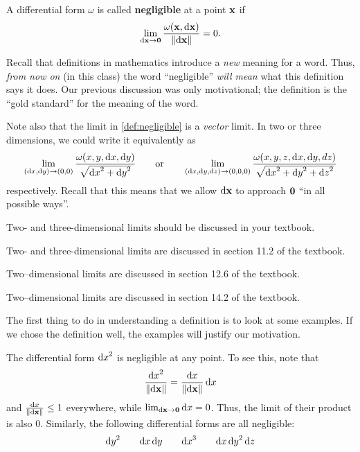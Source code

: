 \documentclass[12pt]{amsart}
\begin{document}
\begin{defn}\label{def:negligible}
  A differential form $\omega$ is called \textbf{negligible} at a point $\mathbf{x}$ if
  \[ \lim_{{\mathrm{d} \mathbf{x}}\to\mathbf{0}} \frac{\omega(\mathbf{x},{\mathrm{d} \mathbf{x}})}{\Vert {\ensuremath{\mathrm{d} \mathbf{x}}} \Vert} = 0. \]
\end{defn}

Recall that definitions in mathematics introduce a \emph{new} meaning for a word.
Thus, \emph{from now on} (in this class) the word ``negligible'' \emph{will mean} what this definition says it does.
Our previous discussion was only motivational; the definition is the ``gold standard'' for the meaning of the word.

Note also that the limit in \cref{def:negligible} is a \emph{vector} limit.
In two or three dimensions, we could write it equivalently as
\[ \lim_{({\mathrm{d} x},{\mathrm{d} y})\to(0,0)} \frac{\omega(x,y,{\mathrm{d} x},{\mathrm{d} y})}{\sqrt{{\mathrm{d} x}^2+{\mathrm{d} y}^2}} \qquad\text{or}\qquad
\lim_{({\mathrm{d} x},{\mathrm{d} y},{\mathrm{d} z})\to(0,0,0)} \frac{\omega(x,y,z,{\mathrm{d} x},{\mathrm{d} y},dz)}{\sqrt{{\mathrm{d} x}^2+{\mathrm{d} y}^2+{\mathrm{d} z}^2}}
\]
respectively.
Recall that this means that we allow ${\mathrm{d} \mathbf{x}}$ to approach $\mathbf{0}$ ``in all possible ways''.
\begin{notextbook}Two- and three-dimensional limits should be discussed in your textbook.\end{notextbook}%
\begin{stewart}Two- and three-dimensional limits are discussed in section 11.2 of the textbook.\end{stewart}
\begin{hugheshallett}Two--dimensional limits are discussed in section 12.6 of the textbook.\end{hugheshallett}
\begin{rogawski}Two--dimensional limits are discussed in section 14.2 of the textbook.\end{rogawski}
The first thing to do in understanding a definition is to look at some examples.
If we chose the definition well, the examples will justify our motivation.

\begin{eg}
  The differential form ${\mathrm{d} x}^2$ is negligible at any point.
  To see this, note that
  \[ \frac{{\mathrm{d} x}^2}{\Vert {\ensuremath{\mathrm{d} \mathbf{x}}} \Vert} = \frac{{\mathrm{d} x}}{\Vert {\ensuremath{\mathrm{d} \mathbf{x}}} \Vert} \,{\mathrm{d} x} \]
  and $\frac{{\mathrm{d} x}}{\Vert {\ensuremath{\mathrm{d} \mathbf{x}}} \Vert}\le 1$ everywhere, while $\lim_{{\mathrm{d} \mathbf{x}}\to\mathbf{0}} {\mathrm{d} x} = 0$.
  Thus, the limit of their product is also $0$.
  Similarly, the following differential forms are all negligible:
  \[ {\mathrm{d} y}^2 \qquad {\ensuremath{\mathrm{d} x}}\,{\mathrm{d} y} \qquad {\ensuremath{\mathrm{d} x}}^3 \qquad {\ensuremath{\mathrm{d} x}}\,{\mathrm{d} y}^2\,{\mathrm{d} z} \]
\end{eg}
\end{document}
